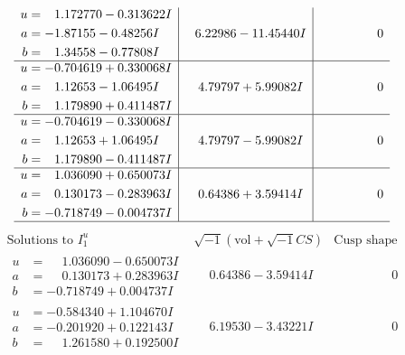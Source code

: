 \documentclass[1p]{elsarticle_modified}
\theoremstyle{definition}
\newcommand{\I}{\sqrt{-1}}
\begin{document}
$$\begin{array}{c|c|c}
\begin{aligned}
u &= \phantom{-}1.172770 - 0.313622 I \\
a &= -1.87155 - 0.48256 I \\
b &= \phantom{-}1.34558 - 0.77808 I\end{aligned}
 & \phantom{-}6.22986 - 11.45440 I & \phantom{-0.000000 } 0 \\ \hline\begin{aligned}
u &= -0.704619 + 0.330068 I \\
a &= \phantom{-}1.12653 - 1.06495 I \\
b &= \phantom{-}1.179890 + 0.411487 I\end{aligned}
 & \phantom{-}4.79797 + 5.99082 I & \phantom{-0.000000 } 0 \\ \hline\begin{aligned}
u &= -0.704619 - 0.330068 I \\
a &= \phantom{-}1.12653 + 1.06495 I \\
b &= \phantom{-}1.179890 - 0.411487 I\end{aligned}
 & \phantom{-}4.79797 - 5.99082 I & \phantom{-0.000000 } 0 \\ \hline\begin{aligned}
u &= \phantom{-}1.036090 + 0.650073 I \\
a &= \phantom{-}0.130173 - 0.283963 I \\
b &= -0.718749 - 0.004737 I\end{aligned}
 & \phantom{-}0.64386 + 3.59414 I & \phantom{-0.000000 } 0\\
 \hline 
 \end{array}$$\newpage$$\begin{array}{c|c|c}  
\text{Solutions to }I^u_{1}& \I (\text{vol} + \sqrt{-1}CS) & \text{Cusp shape}\\
 \hline 
\begin{aligned}
u &= \phantom{-}1.036090 - 0.650073 I \\
a &= \phantom{-}0.130173 + 0.283963 I \\
b &= -0.718749 + 0.004737 I\end{aligned}
 & \phantom{-}0.64386 - 3.59414 I & \phantom{-0.000000 } 0 \\ \hline\begin{aligned}
u &= -0.584340 + 1.104670 I \\
a &= -0.201920 + 0.122143 I \\
b &= \phantom{-}1.261580 + 0.192500 I\end{aligned}
 & \phantom{-}6.19530 - 3.43221 I & \phantom{-0.000000 } 0 \\ \hline\begin{aligned}

\end{aligned}
\end{array}$$
\end{document}
